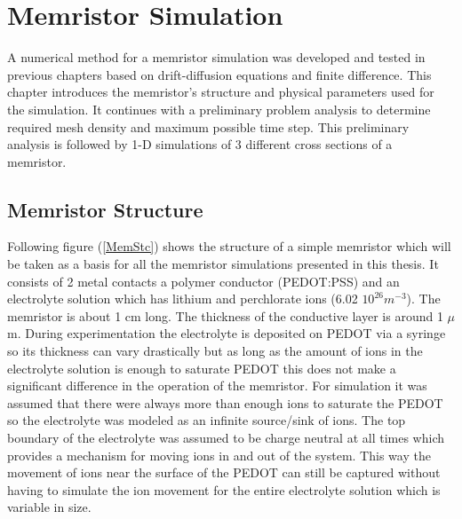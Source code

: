 
\chapter{Memristor Simulation} %

\label{Chapter5} %


A numerical method for a memristor simulation was developed and tested in previous chapters based on drift-diffusion equations and finite difference. This chapter introduces the memristor's structure and physical parameters used for the simulation. It continues with a preliminary problem analysis to determine required mesh density and maximum possible time step. This preliminary analysis is followed by 1-D simulations of 3 different cross sections of a memristor.

\section{Memristor Structure}
Following figure (\ref{MemStc}) shows the structure of a simple memristor which will be taken as a basis for all the memristor simulations presented in this thesis. It consists of 2 metal contacts a polymer conductor (PEDOT:PSS) and an electrolyte solution which has lithium and perchlorate ions (6.02 $10^{26} m^{-3}$). The memristor is about 1 cm long. The thickness of the conductive layer is around 1 $\mu$m. During experimentation the electrolyte is deposited on PEDOT via a syringe so its thickness can vary drastically but as long as the amount of ions in the electrolyte solution is enough to saturate PEDOT this does not make a significant difference in the operation of the memristor. For simulation it was assumed that there were always more than enough ions to saturate the PEDOT so the electrolyte was modeled as an infinite source/sink of ions. The top boundary of the electrolyte was assumed to be charge neutral at all times which provides a mechanism for moving ions in and out of the system. This way the movement of ions near the surface of the PEDOT can still be captured without having to simulate the ion movement for the entire electrolyte solution which is variable in size. 

